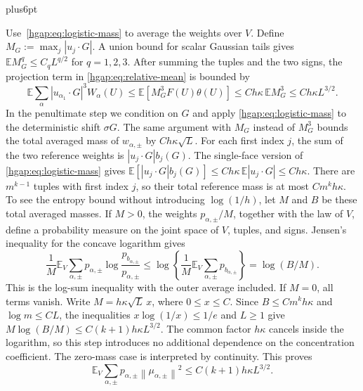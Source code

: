 \documentclass[11pt,letterpaper,twoside,leqno]{article}
\makeatletter
\theoremstyle{bookplain}
\theoremstyle{bookremark}
\renewenvironment{proof}[1][\proofname]{\par
  \pushQED{\qed}\normalfont\topsep6pt plus6pt\relax
  \trivlist\item[\hskip\labelsep\bfseries #1\@addpunct{.}]\ignorespaces
}{\popQED\endtrivlist\@endpefalse}
\newcommand{\E}{\mathbb E}
\newcommand{\norm}[1]{\left\lVert#1\right\rVert}
\makeatother
\begin{document}
\begin{proof}
Use~\eqref{hgap:eq:logistic-mass} to average the weights over $V$.
Define $M_G:=\max_j|u_j\cdot G|$. A union bound for scalar Gaussian
tails gives $\E M_G^q\le C_qL^{q/2}$ for $q=1,2,3$.
After summing the tuples and the two signs, the projection term in
\eqref{hgap:eq:relative-mean} is bounded by
\[
 \E\sum_\alpha |u_{\alpha_1}\cdot G|^3W_\alpha(U)
 \le\E[M_G^3 F(U)\theta(U)]
 \le Ch\kappa\,\E M_G^3\le Ch\kappa L^{3/2}.
\]
In the penultimate step we condition on $G$ and apply
\eqref{hgap:eq:logistic-mass} to the deterministic shift $\sigma G$.
The same argument with $M_G$ instead of $M_G^3$ bounds the total
averaged mass of $w_{\alpha,\pm}$ by $Ch\kappa\sqrt L$.
For each first index $j$, the sum of the two reference weights is
$|u_j\cdot G|b_j(G)$. The single-face version of
\eqref{hgap:eq:logistic-mass} gives
$\E[|u_j\cdot G|b_j(G)]\le Ch\kappa\,\E|u_j\cdot G|
\le Ch\kappa$. There are $m^{k-1}$ tuples with first index $j$,
so their total reference mass is at most $Cm^kh\kappa$.
To see the entropy bound without introducing $\log(1/h)$, let $M$
and $B$ be these total averaged masses. If $M>0$, the weights
$p_{\alpha,\pm}/M$, together with the law of $V$, define a probability
measure on the joint space of $V$, tuples, and signs. Jensen's inequality
for the concave logarithm gives
\[
 \frac1M\E_V\sum_{\alpha,\pm}p_{\alpha,\pm}
       \log\frac{p_{b_{\alpha,\pm}}}{p_{\alpha,\pm}}
 \le\log\left\{\frac1M\E_V\sum_{\alpha,\pm}
                                      p_{b_{\alpha,\pm}}\right\}
 =\log(B/M).
\]
This is the log-sum inequality with the outer average included.
If $M=0$, all terms vanish. Write $M=h\kappa\sqrt L\,x$, where
$0\le x\le C$. Since $B\le Cm^kh\kappa$ and $\log m\le CL$, the
inequalities $x\log(1/x)\le1/e$ and $L\ge1$ give
$M\log(B/M)\le C(k+1)h\kappa L^{3/2}$. The common factor
$h\kappa$ cancels inside the logarithm, so this step introduces no
additional dependence on the concentration coefficient. The zero-mass case is interpreted
by continuity. This proves
\begin{equation}
 \E_V\sum_{\alpha,\pm}p_{\alpha,\pm}
                   \norm{\mu_{\alpha,\pm}}^2\le C(k+1)h\kappa L^{3/2}.
 \label{hgap:eq:cubic-means}
\end{equation}


\end{proof}
\end{document}

